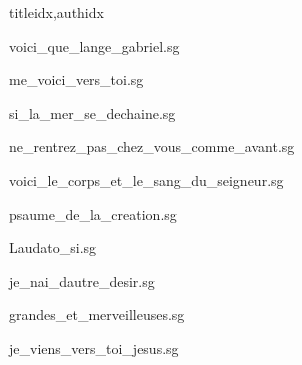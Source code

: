 \documentclass[12pt]{article}
\begin{document}
\begin{songs}{titleidx,authidx}

{voici_que_lange_gabriel.sg}


{me_voici_vers_toi.sg}


{si_la_mer_se_dechaine.sg}


{ne_rentrez_pas_chez_vous_comme_avant.sg}


{voici_le_corps_et_le_sang_du_seigneur.sg}


{psaume_de_la_creation.sg}


{Laudato_si.sg}


{je_nai_dautre_desir.sg}


{grandes_et_merveilleuses.sg}


{je_viens_vers_toi_jesus.sg}

\end{songs}
\end{document}
